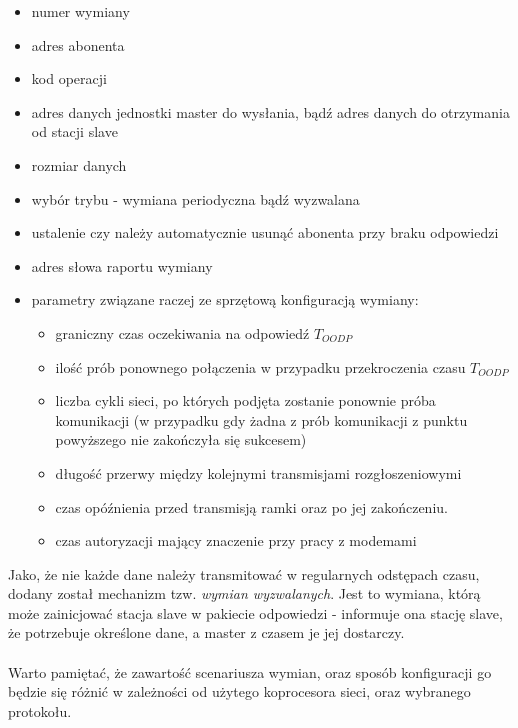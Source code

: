 	\begin{itemize}
		\item numer wymiany
		\item adres abonenta
		\item kod operacji
		\item adres danych jednostki master do wysłania, bądź adres danych do otrzymania od stacji slave
		\item rozmiar danych
		\item wybór trybu - wymiana periodyczna bądź wyzwalana
		\item ustalenie czy należy automatycznie usunąć abonenta przy braku odpowiedzi
		\item adres słowa raportu wymiany
		\item parametry związane raczej ze sprzętową konfiguracją wymiany:
		\begin{itemize}
			\item graniczny czas oczekiwania na odpowiedź $ T_{OODP} $
			\item ilość prób ponownego połączenia w przypadku przekroczenia czasu $ T_{OODP} $
			\item liczba cykli sieci, po których podjęta zostanie ponownie próba komunikacji (w przypadku gdy żadna z prób komunikacji z punktu powyższego nie zakończyła się sukcesem)
			\item długość przerwy między kolejnymi transmisjami rozgłoszeniowymi
			\item czas opóźnienia przed transmisją ramki oraz po jej zakończeniu.
			\item czas autoryzacji mający znaczenie przy pracy z modemami
		\end{itemize}
	\end{itemize}
	Jako, że nie każde dane należy transmitować w regularnych odstępach czasu, dodany został mechanizm tzw. \textit{wymian wyzwalanych}. Jest to wymiana, którą może zainicjować stacja slave w pakiecie odpowiedzi - informuje ona stację slave, że potrzebuje określone dane, a master z czasem je jej dostarczy.\\
	\\
	Warto pamiętać, że zawartość scenariusza wymian, oraz sposób konfiguracji go będzie się różnić w zależności od użytego koprocesora sieci, oraz wybranego protokołu.